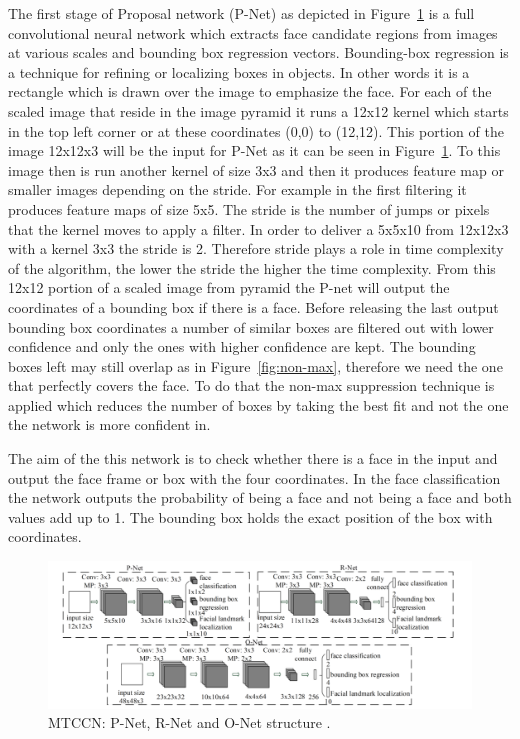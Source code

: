 The first stage of Proposal network (P-Net) as depicted in Figure~\ref{fig:3stages} is a full convolutional neural network which extracts face candidate regions from images at various scales and bounding box regression vectors. Bounding-box regression is a technique for refining or localizing boxes in objects. In other words it is a rectangle which is drawn over the image to emphasize the face. For each of the scaled image that reside in the image pyramid it runs a 12x12 kernel which starts in the top left corner or at these coordinates (0,0) to (12,12). This portion of the image 12x12x3 will be the input for P-Net as it can be seen in Figure~\ref{fig:3stages}. To this image then is run another kernel of size 3x3 and then it produces feature map or smaller images depending on the stride. For example in the first filtering it produces feature maps of size 5x5. The stride is the number of jumps or pixels that the kernel moves to apply a filter. In order to deliver a 5x5x10 from 12x12x3 with a kernel 3x3 the stride is 2. Therefore stride plays a role in time complexity of the algorithm, the lower the stride the higher the time complexity. From this 12x12 portion of a scaled image from pyramid the P-net will output the coordinates of a bounding box if there is a face. Before releasing the last output bounding box coordinates a number of similar boxes are filtered out with lower confidence and only the ones with higher confidence are kept. The bounding boxes left may still overlap as in Figure~\ref{fig:non-max}, therefore we need the one that perfectly covers the face. To do that the non-max suppression technique is applied which reduces the number of boxes by taking the best fit and not the one the network is more confident in. 




The aim of the this network is to check whether there is a face in the input and output the face frame or box with the four coordinates. In the face classification the network outputs the probability of being a face and not being a face and both values add up to 1. The bounding box holds the exact position of the box with coordinates. 


\begin{figure}[!htb]
    \centering
    \includegraphics[width=1\textwidth]{figures/3stages.png}
    \caption{ MTCCN: P-Net, R-Net and O-Net structure \cite{refmtcnn}.}
    \label{fig:3stages}
\end{figure}


